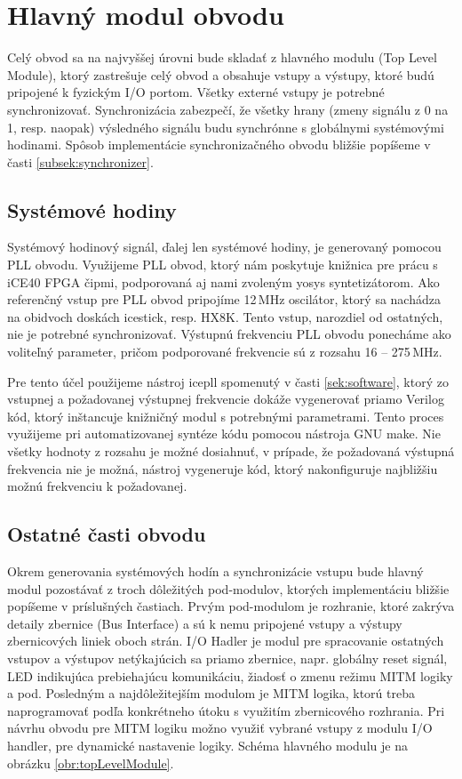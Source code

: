 \section{Hlavný modul obvodu}
Celý obvod sa na najvyššej úrovni bude skladať z hlavného modulu (Top Level Module), ktorý zastrešuje celý obvod a obsahuje vstupy a výstupy, ktoré budú pripojené k fyzickým I/O portom. Všetky externé vstupy je potrebné synchronizovať. Synchronizácia zabezpečí, že všetky hrany (zmeny signálu z 0 na 1, resp. naopak) výsledného signálu budu synchrónne s globálnymi systémovými hodinami. Spôsob implementácie synchronizačného obvodu bližšie popíšeme v časti \ref{subsek:synchronizer}.

\subsection{Systémové hodiny}
Systémový hodinový signál, ďalej len systémové hodiny, je generovaný pomocou PLL obvodu. Využijeme PLL obvod, ktorý nám poskytuje knižnica pre prácu s iCE40 FPGA čipmi, podporovaná aj nami zvoleným yosys syntetizátorom. Ako referenčný vstup pre PLL obvod pripojíme 12\,MHz oscilátor, ktorý sa nachádza na obidvoch doskách icestick, resp. HX8K. Tento vstup, narozdiel od ostatných, nie je potrebné synchronizovať. Výstupnú frekvenciu PLL obvodu ponecháme ako voliteľný parameter, pričom podporované frekvencie sú z rozsahu 16 -- 275\,MHz.

Pre tento účel použijeme nástroj icepll spomenutý v časti \ref{sek:software}, ktorý zo vstupnej a požadovanej výstupnej frekvencie dokáže vygenerovať priamo Verilog kód, ktorý inštancuje knižničný modul s potrebnými parametrami.
Tento proces využijeme pri automatizovanej syntéze kódu pomocou nástroja GNU make. Nie všetky hodnoty z rozsahu je možné dosiahnuť, v prípade, že požadovaná výstupná frekvencia nie je možná, nástroj vygeneruje kód, ktorý nakonfiguruje najbližšiu možnú frekvenciu k požadovanej.

\subsection{Ostatné časti obvodu}
Okrem generovania systémových hodín a synchronizácie vstupu bude hlavný modul pozostávať z troch dôležitých pod-modulov, ktorých implementáciu bližšie popíšeme v príslušných častiach. Prvým pod-modulom je rozhranie, ktoré zakrýva detaily zbernice (Bus Interface) a sú k nemu pripojené vstupy a výstupy zbernicových liniek oboch strán. I/O Hadler je modul pre spracovanie ostatných vstupov a výstupov netýkajúcich sa priamo zbernice, napr. globálny reset signál, LED indikujúca prebiehajúcu komunikáciu, žiadosť o zmenu režimu MITM logiky a pod. Posledným a najdôležitejším modulom je MITM logika, ktorú treba naprogramovať podľa konkrétneho útoku s využitím zbernicového rozhrania. Pri návrhu obvodu pre MITM logiku možno využiť vybrané vstupy z modulu I/O handler, pre dynamické nastavenie logiky. Schéma hlavného modulu je na obrázku \ref{obr:topLevelModule}.

